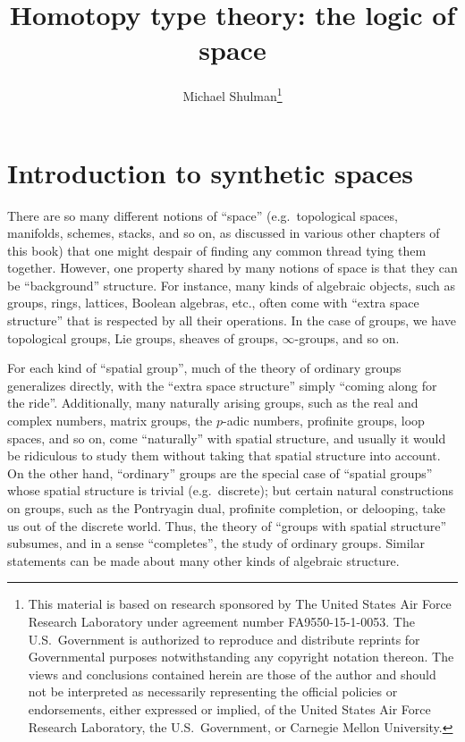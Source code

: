 \documentclass[10pt]{article}
\title{Homotopy type theory: the logic of space}
\author{Michael Shulman\thanks{This material is based on research sponsored by The United States Air Force Research Laboratory under agreement number FA9550-15-1-0053.  The U.S.~Government is authorized to reproduce and distribute reprints for Governmental purposes notwithstanding any copyright notation thereon.  The views and conclusions contained herein are those of the author and should not be interpreted as necessarily representing the official policies or endorsements, either expressed or implied, of the United States Air Force Research Laboratory, the U.S.~Government, or Carnegie Mellon University.}}
\def\oo{\ensuremath{\infty}}
\numberwithin{equation}{section}
\begin{document}
\maketitle

\section{Introduction to synthetic spaces}
\label{sec:introduction}

There are so many different notions of ``space'' (e.g.\ topological spaces, manifolds, schemes, stacks, and so on, as discussed in various other chapters of this book) that one might despair of finding any common thread tying them together.
However, one property shared by many notions of space is that they can be ``background'' structure.
For instance, many kinds of algebraic objects, such as groups, rings, lattices, Boolean algebras, etc., often come with ``extra space structure'' that is respected by all their operations.
In the case of groups, we have topological groups, Lie groups, sheaves of groups, \oo-groups, and so on.

For each kind of ``spatial group'', much of the theory of ordinary groups generalizes directly, with the ``extra space structure'' simply ``coming along for the ride''.
Additionally, many naturally arising groups, such as the real and complex numbers, matrix groups, the $p$-adic numbers, profinite groups, loop spaces, and so on, come ``naturally'' with spatial structure, and usually it would be ridiculous to study them without taking that spatial structure into account.
On the other hand, ``ordinary'' groups are the special case of ``spatial groups'' whose spatial structure is trivial (e.g.\ discrete); but certain natural constructions on groups, such as the Pontryagin dual, profinite completion, or delooping, take us out of the discrete world.
Thus, the theory of ``groups with spatial structure'' subsumes, and in a sense ``completes'', the study of ordinary groups.
Similar statements can be made about many other kinds of algebraic structure.
\end{document}
